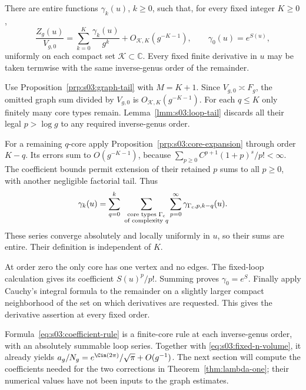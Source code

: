 \begin{thm}
\label{thm:s03:graph-expansion}
There are entire functions $\gamma_k(u)$, $k\geq0$, such that,
for every fixed integer $K\geq0$,
\begin{equation}
\label{eq:s03:graph-expansion}
\frac{Z_g(u)}{V_{g,0}}
=\sum_{k=0}^K\frac{\gamma_k(u)}{g^k}
 +O_{\mathcal K,K}(g^{-K-1}),\qquad
\gamma_0(u)=e^{S(u)},
\end{equation}
uniformly on each compact set $\mathcal K\subset\mathbb C$.
Every fixed finite derivative in $u$ may be taken termwise with
the same inverse-genus order of the remainder.
\end{thm}
\begin{prf}
Use Proposition~\ref{prp:s03:graph-tail} with $M=K+1$.
Since $V_{g,0}\asymp F_g$, the omitted graph sum divided by
$V_{g,0}$ is $O_{\mathcal K,K}(g^{-K-1})$.
For each $q\leq K$ only finitely many core types remain.
Lemma~\ref{lmm:s03:loop-tail} discards all their legal
$p>\log g$ to any required inverse-genus order.

For a remaining $q$-core apply
Proposition~\ref{prp:s03:core-expansion} through order $K-q$.
Its errors sum to $O(g^{-K-1})$, because
$\sum_{p\geq0}C^{p+1}(1+p)^s/p!<\infty$.
The coefficient bounds permit extension of their retained $p$ sums
to all $p\geq0$, with another negligible factorial tail.
Thus
\begin{equation}
\label{eq:s03:coefficient-rule}
\gamma_k(u)=
 \sum_{q=0}^k\ \sum_{\substack{\text{core types }\Gamma_{\rm c}\\
                              \text{of complexity }q}}
 \sum_{p=0}^{\infty}\gamma_{\Gamma_{\rm c},p,k-q}(u).
\end{equation}
These series converge absolutely and locally uniformly in $u$, so
their sums are entire. Their definition is independent of $K$.

At order zero the only core has one vertex and no edges.
The fixed-loop calculation gives its coefficient $S(u)^p/p!$.
Summing proves $\gamma_0=e^S$.
Finally apply Cauchy's integral formula to the remainder on a slightly
larger compact neighborhood of the set on which derivatives are
requested. This gives the derivative assertion at every fixed order.
\end{prf}

\begin{rmk}
Formula~\eqref{eq:s03:coefficient-rule} is a finite-core rule at
each inverse-genus order, with an absolutely summable loop series.
Together with \eqref{eq:s03:fixed-n-volume}, it already yields
$a_g/N_g=e^{\Cin(2\pi)}/\sqrt\pi+O(g^{-1})$.
The next section will compute the coefficients needed for the
two corrections in Theorem~\ref{thm:lambda-one}; their numerical
values have not been inputs to the graph estimates.
\end{rmk}

